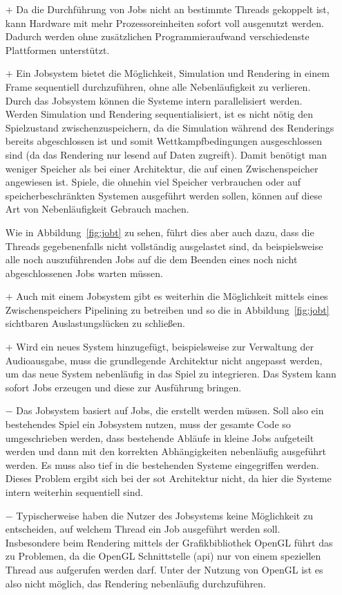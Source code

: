 \begin{itemize}
	\item[$+$]  Da die Durchführung von Jobs nicht an bestimmte Threads gekoppelt ist, kann Hardware mit mehr Prozessoreinheiten sofort voll ausgenutzt werden. Dadurch werden ohne zusätzlichen Programmieraufwand verschiedenste Plattformen unterstützt.
	\item[$+$] Ein Jobsystem bietet die Möglichkeit, Simulation und Rendering in einem Frame sequentiell durchzuführen, ohne alle Nebenläufigkeit zu verlieren. Durch das Jobsystem können die Systeme intern parallelisiert werden. Werden Simulation und Rendering sequentialisiert, ist es nicht nötig den Spielzustand zwischenzuspeichern, da die Simulation während des Renderings bereits abgeschlossen ist und somit Wettkampfbedingungen ausgeschlossen sind (da das Rendering nur lesend auf Daten zugreift). Damit benötigt man weniger Speicher als bei einer Architektur, die auf einen Zwischenspeicher angewiesen ist. Spiele, die ohnehin viel Speicher verbrauchen oder auf speicherbeschränkten Systemen ausgeführt werden sollen, können auf diese Art von Nebenläufigkeit Gebrauch machen. 
	
	Wie in Abbildung~\ref{fig:jobt} zu sehen, führt dies aber auch dazu, dass die Threads gegebenenfalls nicht vollständig ausgelastet sind, da beispielsweise alle noch auszuführenden Jobs auf die dem Beenden eines noch nicht abgeschlossenen Jobs warten müssen.
	\item[$+$] Auch mit einem Jobsystem gibt es weiterhin die Möglichkeit mittels eines Zwischenspeichers Pipelining zu betreiben und so die in Abbildung~\ref{fig:jobt} sichtbaren Auslastungslücken zu schließen.
	\item[$+$] Wird ein neues System hinzugefügt, beispielsweise zur Verwaltung der Audioausgabe, muss die grundlegende Architektur nicht angepasst werden, um das neue System nebenläufig in das Spiel zu integrieren. Das System kann sofort Jobs erzeugen und diese zur Ausführung bringen.
	\item[$-$] Das Jobsystem basiert auf Jobs, die erstellt werden müssen. Soll also ein bestehendes Spiel ein Jobsystem nutzen, muss der gesamte Code so umgeschrieben werden, dass bestehende Abläufe in kleine Jobs aufgeteilt werden und dann mit den korrekten Abhängigkeiten nebenläufig ausgeführt werden. Es muss also tief in die bestehenden Systeme eingegriffen werden. Dieses Problem ergibt sich bei der \ac{sot} Architektur nicht, da hier die Systeme intern weiterhin sequentiell sind.
	\item[$-$] Typischerweise haben die Nutzer des Jobsystems keine Möglichkeit zu entscheiden, auf welchem Thread ein Job ausgeführt werden soll. Insbesondere beim Rendering mittels der Grafikbibliothek OpenGL führt das zu Problemen, da die OpenGL Schnittstelle (\acs{api}) nur von einem speziellen Thread aus aufgerufen werden darf. Unter der Nutzung von OpenGL ist es also nicht möglich, das Rendering nebenläufig durchzuführen.
\end{itemize}

